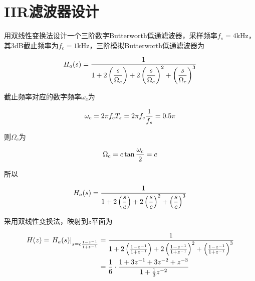 \documentclass[cn, hazy, blue, normal, 14pt]{elegantnote}
\begin{document}
\section{IIR滤波器设计}

\begin{exercise}

用双线性变换法设计一个三阶数字Butterworth低通滤波器，采样频率$f_s=4\text{kHz}$，其3dB截止频率为$f_c=1\text{kHz}$，三阶模拟Butterworth低通滤波器为

\begin{equation}
\notag
    H_a(s)=\dfrac{1}{1+2\left(\dfrac{s}{\Omega_c}\right)+2\left(\dfrac{s}{\Omega_c}\right)^2+\left(\dfrac{s}{\Omega_c}\right)^3}
\end{equation}

\end{exercise}

\begin{solution}[print=true]

截止频率对应的数字频率$\omega_c$为

\begin{equation}
\notag
    \omega_c=2\pi  f_c T_s=2\pi f_c\dfrac{1}{f_s}=0.5\pi
\end{equation}

则$\Omega_c$为

\begin{equation}
\notag
    \Omega_c=c\tan\dfrac{\omega_c}{2}=c
\end{equation}

所以

\begin{equation}
\notag
    H_a(s)=\dfrac{1}{1+2\left(\dfrac{s}{c}\right)+2\left(\dfrac{s}{c}\right)^2+\left(\dfrac{s}{c}\right)^3}
\end{equation}

采用双线性变换法，映射到$z$平面为

\begin{equation}
\notag
\begin{aligned}
    H(z)=\left.H_a(s)\right|_{s=c\frac{1-z^{-1}}{1+z^{-1}}}&=\dfrac{1}{1+2\left(\frac{1-z^{-1}}{1+z^{-1}}\right)+2\left(\frac{1-z^{-1}}{1+z^{-1}}\right)^2+\left(\frac{1-z^{-1}}{1+z^{-1}}\right)^3} \\
    &=\frac{1}{6}\cdot\frac{1+3z^{-1}+3z^{-2}+z^{-3}}{1+\frac{1}{3}z^{-2}}
\end{aligned}
\end{equation}

\end{solution}
\end{document}
